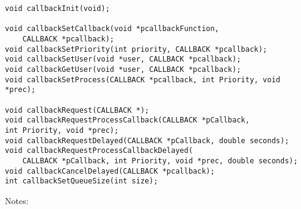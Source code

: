 \begin{verbatim}void callbackInit(void);

void callbackSetCallback(void *pcallbackFunction,
    CALLBACK *pcallback);
void callbackSetPriority(int priority, CALLBACK *pcallback);
void callbackSetUser(void *user, CALLBACK *pcallback);
void callbackGetUser(void *user, CALLBACK *pcallback);
void callbackSetProcess(CALLBACK *pcallback, int Priority, void *prec);

void callbackRequest(CALLBACK *);
void callbackRequestProcessCallback(CALLBACK *pCallback,
int Priority, void *prec);
void callbackRequestDelayed(CALLBACK *pCallback, double seconds);
void callbackRequestProcessCallbackDelayed(
    CALLBACK *pCallback, int Priority, void *prec, double seconds);
void callbackCancelDelayed(CALLBACK *pcallback);
int callbackSetQueueSize(int size);

\end{verbatim}
Notes:

